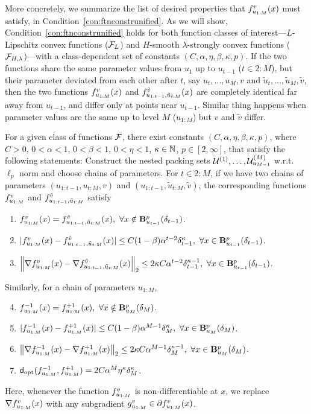 More concretely, we summarize the list of desired properties that $f_{u_{1:M}}^v(x)$ must satisfy, in Condition~\ref{con:ftnconstrunified}.
As we will show, Condition~\ref{con:ftnconstrunified} holds for both function classes of interest---$L$-Lipschitz convex functions ($\mathcal{F}_{L}$) and $H$-smooth $\lambda$-strongly convex functions ($\mathcal{F}_{H,\lambda}$)---with a class-dependent set of constants $(C, \alpha, \eta, \beta, \kappa, p)$.
If the two functions share the same parameter values from $u_1$ up to $u_{t-1}$ ($t \in 2:M$),
but their parameter deviated from each other after $t$, say $u_t, \dots, u_M, v$ and $\tilde u_t, \dots, \tilde u_M, \tilde v$, 
then the two functions $f_{u_{1:M}}^v(x)$ and $f_{u_{1:t-1}, \tilde u_{t:M}}^{\tilde v}(x)$ are completely identical far away from $u_{t-1}$, and differ only at points near $u_{t-1}$.
Similar thing happens when parameter values are the same up to level $M$ ($u_{1:M}$) but $v$ and $\tilde v$ differ.
\begin{condition}
	\label{con:ftnconstrunified}
	For a given class of functions $\mathcal{F}$, there exist constants $(C, \alpha, \eta, \beta, \kappa, p)$, where $C>0$, $0<\alpha<1$, $0<\beta<1$, $0<\eta<1$, $\kappa \in \mathbb{N}$, $p \in [2, \infty]$,
	that satisfy the following statements:
	Construct the nested packing sets $\mathcal{U}^{(1)}, \dots, \mathcal{U}^{({M})}_{u_{M-1}}$ w.r.t.\ $\ell_p$ norm and choose chains of parameters.
	For $t \in 2:M$, if we have two chains of parameters $(u_{1:t-1}, u_{t:M}, v)$ and
	$(u_{1:t-1}, \tilde u_{t:M}, \tilde v)$, the corresponding functions 
	$f_{u_{1:M}}^v$ and $f_{u_{1:t-1}, \tilde u_{t:M}}^{\tilde v}$ satisfy
	\begin{enumerate}
		\item \label{item:ftnconstrunified-1}
		$f_{u_{1:M}}^v(x) = f_{u_{1:t-1}, \tilde u_{t:M}}^{\tilde v}(x),~\forall x \notin \mathbf{B}^p_{u_{t-1}}({\delta_{t-1}})$.
		\item \label{item:ftnconstrunified-2}
		$| f_{u_{1:M}}^v(x) - f_{u_{1:t-1}, \tilde u_{t:M}}^{\tilde v}(x) | \leq C(1-\beta) \alpha^{t-2} \delta_{t-1}^\kappa,~\forall x \in \mathbf{B}^p_{u_{t-1}}({\delta_{t-1}})$.
		\item \label{item:ftnconstrunified-3}
		$\left\|{\nabla f_{u_{1:M}}^v(x) - \nabla f_{u_{1:t-1}, \tilde u_{t:M}}^{\tilde v}(x)}\right\|_2 \leq 2 \kappa C\alpha^{t-2} \delta_{t-1}^{\kappa-1},~\forall x \in \mathbf{B}^p_{u_{t-1}}({\delta_{t-1}})$.
	\end{enumerate}	
	Similarly, for a chain of parameters $u_{1:M}$,
	\begin{enumerate}
		\setcounter{enumi}{3}
		\item \label{item:ftnconstrunified-4}
		$f_{u_{1:M}}^{-1}(x) = f_{u_{1:M}}^{+1}(x),~ \forall x \notin \mathbf{B}^p_{u_{M}}({\delta_{M}})$.
		\item \label{item:ftnconstrunified-5}
		$| f_{u_{1:M}}^{-1}(x) - f_{u_{1:M}}^{+1}(x) | \leq C(1-\beta) \alpha^{M-1} \delta_M^{\kappa},~ \forall x \in \mathbf{B}^p_{u_{M}}({\delta_{M}})$.
		\item \label{item:ftnconstrunified-6}
		$\left\|{\nabla f_{u_{1:M}}^{-1}(x) - \nabla f_{u_{1:M}}^{+1}(x)}\right\|_2 \leq 2 \kappa C\alpha^{M-1} \delta_{M}^{\kappa-1},~ \forall x \in \mathbf{B}^p_{u_{M}}({\delta_{M}})$.
		\item \label{item:ftnconstrunified-7}
		$\fndist(\ftnuvm,\ftnuvp) = 2C\alpha^M \eta^\kappa \delta_M^\kappa$.
	\end{enumerate}
	Here, whenever the function $f_{u_{1:M}}^v$ is non-differentiable at $x$,
	we replace $\nabla f_{u_{1:M}}^v(x)$ with any subgradient $g_{u_{1:M}}^v \in \partial f_{u_{1:M}}^v(x)$.
\end{condition}

